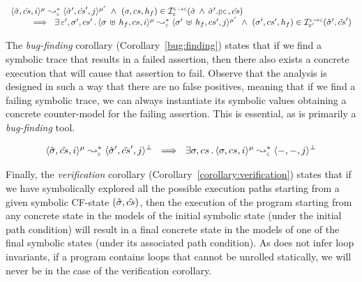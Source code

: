 \begin{theorem}[Soundiness]\label{teo:soundness:jsil:symb:exe}
$$
\begin{array}{l}
\transabssemrule{\sstate, \scs, i}{\sstate', \scs', j}{\mode}{\mode'}{\symbolic}  \ \wedge \ (\jstate, \cs, \heap_f) \in \interpret{\symbconc}{\senv}(\sstate \, \wedge \, \sstate'.\pcsel, \scs) \\ \quad \quad 
    \ \implies \ \exists \, \senv', \jstate', \cs' \, . \, 
        \transabssemrule{\jstate \dunion \heap_f, \cs, i}{\jstate' \dunion \heap_f, \cs', j}{\mode}{\mode'}{\concrete}
               \ \wedge \ (\jstate', \cs', \heap_f) \in \interpret{\symbconc}{\senv'}(\sstate', \scs')
\end{array}
$$
\end{theorem}

The \emph{bug-finding} corollary (Corollary~\ref{bug:finding}) states that if 
we find a symbolic trace that results in a failed assertion, 
then there also exists a concrete execution that will cause that assertion to fail.
Observe that the analysis is designed in such a way that there are no false positives, 
meaning that if we find a failing symbolic trace,
we can always instantiate its symbolic values obtaining a concrete counter-model for the 
failing assertion. This is essential, as \jilette is primarily a \emph{bug-finding} tool.


\begin{corollary}\label{bug:finding}
$$
\transabssemrule{\sstate, \scs, i}{\sstate', \scs', j}{\mode}{\bot}{\symbolic}  
      \ \implies \  \exists \jstate, \cs \, . \, \transabssemrule{\jstate, \cs, i}{-, -, j}{\mode}{\bot}{\concrete} 
$$
\end{corollary}

Finally, the \emph{verification} corollary (Corollary~\ref{corollary:verification})
states that if we have symbolically explored all the possible execution paths
starting from a given symbolic CF-state $(\hat{\sigma}, \hat{cs})$,  
then the execution of the program starting from  any concrete state in the models 
of the initial symbolic state (under the initial path condition) will result in a final concrete state
in the models of one of the final symbolic states (under its associated path condition).  
As \jilette does not infer loop invariants, if a \jsil program contains loops that cannot be 
unrolled statically, we will never be in the case of the verification corollary. 

